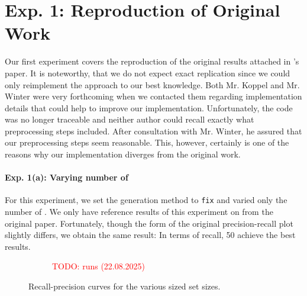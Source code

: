 
\section{Exp. 1: Reproduction of Original Work}

Our first experiment covers the reproduction of the original results attached in \citet{koppel_determining_2014}'s paper.
It is noteworthy, that we do not expect exact replication since we could only reimplement the approach to our best knowledge.
Both Mr. Koppel and Mr. Winter were very forthcoming when we contacted them regarding implementation details that could help to improve our implementation.
Unfortunately, the code was no longer traceable and neither author could recall exactly what preprocessing steps included.
After consultation with Mr. Winter, he assured that our preprocessing steps seem reasonable.
This, however, certainly is one of the reasons why our implementation diverges from the original work.

\paragraph{Exp. 1(a): Varying number of \imps{}}

For this experiment, we set the \imp{} generation method to \texttt{fix} and varied only the number of \imps{}.
We only have reference results of this experiment on \dataBlog{} from the original paper.
Fortunately, though the form of the original precision-recall plot slightly differs, we obtain the same result:
In terms of recall, 50 \imps{} achieve the best results.

\begin{figure}[htbp]
  \centering
  \begin{subfigure}[b]{0.48\textwidth}
    \centering
    
    \caption{\dataBlog{} \textcolor{red}{TODO: runs (22.08.2025)}}
    \label{fig:blog_dif_n}
  \end{subfigure}
  \hfill
  \begin{subfigure}[b]{0.48\textwidth}
    \centering
    
    \caption{\dataStudent{}}
    \label{fig:student_essays_dif_n}
  \end{subfigure}
  \caption{Recall-precision curves for the various sized \imp{} set sizes.}
  \label{fig:repr_diff_n_imps_fixed}
\end{figure}



